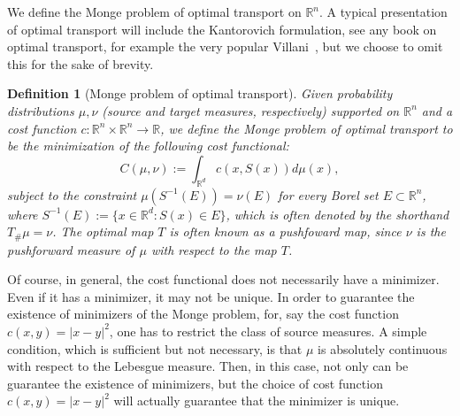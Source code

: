 \documentclass{amsart}
\theoremstyle{lemma}
\newtheorem{definition}[theorem]{Definition}
\theoremstyle{remark}
\begin{document}
We define the Monge problem of optimal transport on $\mathbb{R}^n$. A typical presentation of optimal transport will include the Kantorovich formulation, see any book on optimal transport, for example the very popular Villani~\cite{Villani1}, but we choose to omit this for the sake of brevity.

\begin{definition}[Monge problem of optimal transport]
Given probability distributions $\mu, \nu$ (source and target measures, respectively) supported on $\mathbb{R}^n$ and a cost function $c: \mathbb{R}^n \times \mathbb{R}^n \rightarrow \mathbb{R}$, we define the Monge problem of optimal transport to be the minimization of the following cost functional:
\begin{equation}
C(\mu, \nu) := \int_{\mathbb{R}^d} c(x,S(x)) d\mu(x),
\end{equation}
subject to the constraint $\mu(S^{-1}(E)) = \nu(E)$ for every Borel set $E \subset \mathbb{R}^n$, where $S^{-1}(E) := \{x \in \mathbb{R}^d: S(x) \in E \}$, which is often denoted by the shorthand $T_{\#} \mu = \nu$. The optimal map $T$ is often known as a pushfoward map, since $\nu$ is the pushforward measure of $\mu$ with respect to the map $T$.
\end{definition}

Of course, in general, the cost functional does not necessarily have a minimizer. Even if it has a minimizer, it may not be unique. In order to guarantee the existence of minimizers of the Monge problem, for, say the cost function $c(x,y) = \vert x - y \vert^2$, one has to restrict the class of source measures. A simple condition, which is sufficient but not necessary, is that $\mu$ is absolutely continuous with respect to the Lebesgue measure. Then, in this case, not only can be guarantee the existence of minimizers, but the choice of cost function $c(x,y) = \vert x - y \vert^2$ will actually guarantee that the minimizer is unique.
\end{document}
